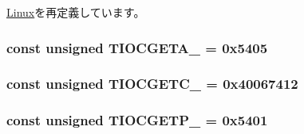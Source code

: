 \hyperlink{classLinux_a9e303b6c52672934210e6db497f0da88}{Linux}を再定義しています。\hypertarget{classArmLinux64_a5e6352f7b3493d60efab0e811b9f23be}{
\subsubsection[{TIOCGETA\_\-}]{\setlength{\rightskip}{0pt plus 5cm}const unsigned {\bf TIOCGETA\_\-} = 0x5405}}
\label{classArmLinux64_a5e6352f7b3493d60efab0e811b9f23be}
\hypertarget{classArmLinux64_aad5ef7742595f935f5d33b46238c8b90}{
\subsubsection[{TIOCGETC\_\-}]{\setlength{\rightskip}{0pt plus 5cm}const unsigned {\bf TIOCGETC\_\-} = 0x40067412}}
\label{classArmLinux64_aad5ef7742595f935f5d33b46238c8b90}
\hypertarget{classArmLinux64_a7ab31748d0ee4ff17de14aff6476785d}{
\subsubsection[{TIOCGETP\_\-}]{\setlength{\rightskip}{0pt plus 5cm}const unsigned {\bf TIOCGETP\_\-} = 0x5401}}
\label{classArmLinux64_a7ab31748d0ee4ff17de14aff6476785d}


